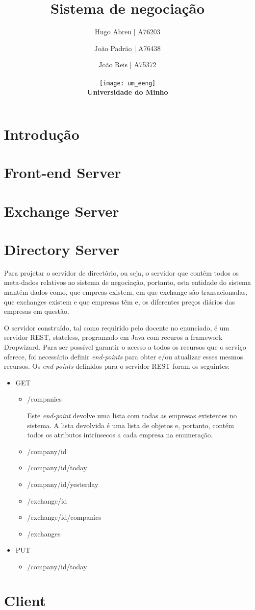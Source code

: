\documentclass[a4paper,12pt]{article}
\title{Sistema de negociação}
\author{Hugo Abreu | A76203 \and João Padrão | A76438\and João Reis | A75372
\\\\ \texttt{[image: um\_eeng]} \\ \textbf{Universidade do Minho}}
\begin{document}
\maketitle


\section{Introdução}

\section{Front-end Server}

\section{Exchange Server}

\section{Directory Server}
Para projetar o servidor de directório, ou seja, o servidor que contém todos os meta-dados relativos ao sistema de negociação, portanto, esta entidade do sistema mantém dados como, que empreas existem, em que exchange são transacionadas, que exchanges existem e que empresas têm e, os diferentes preços diários das empresas em questão.
\par O servidor construído, tal como requirido pelo docente no enunciado, é um servidor REST, stateless, programado em Java com recuros a framework Dropwizard. Para ser possível garantir o acesso a todos os recursos que o serviço oferece, foi necessário definir \textit{end-points} para obter e/ou atualizar esses mesmos recursos. Os \textit{end-points} definidos para o servidor REST foram os seguintes:

\begin{itemize}
\item GET
  \begin{itemize}
    \item /companies
    \par Este \textit{end-point} devolve uma lista com todas as empresas existentes no sistema. A lista devolvida é uma lista de objetos e, portanto, contém todos os atributos intrínsecos a cada empresa na enumeração.
    \item /company/{id}
    \item /company/{id}/today
    \item /company/{id}/yesterday
    \item /exchange/{id}
    \item /exchange/{id}/companies
    \item /exchanges
  \end{itemize}
\item PUT
  \begin{itemize}
    \item /company/{id}/today
  \end{itemize}
\end{itemize}

\section{Client}
\end{document}

